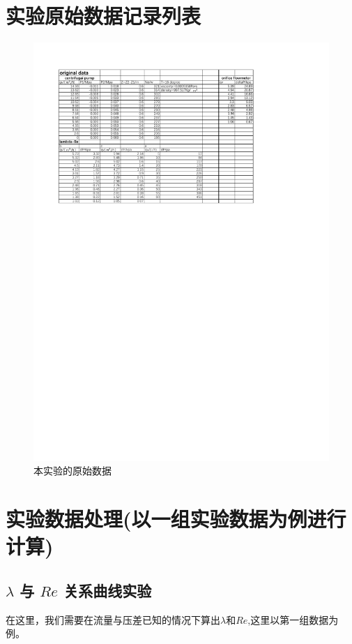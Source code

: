 \documentclass[a4paper,UTF8]{ctexrep}
\theoremstyle{plain}
\theoremstyle{definition}
\numberwithin{equation}{chapter}
\begin{document}
        \section{实验原始数据记录列表}
\begin{figure}[h]
    \centering
    \includegraphics[width=\linewidth]{5th_orig.pdf}
    \caption{本实验的原始数据}
    \label{fig:enter-label}
\end{figure}


        \section{实验数据处理(以一组实验数据为例进行计算)}
        \subsection{$\lambda$ 与 $Re$ 关系曲线实验}
        在这里，我们需要在流量与压差已知的情况下算出$\lambda$和$Re$,这里以第一组数据为例。
\end{document}

